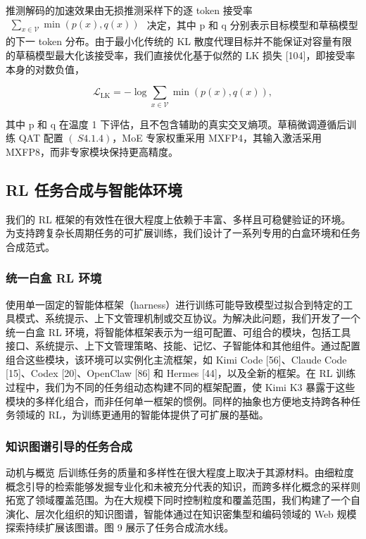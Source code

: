 推测解码的加速效果由无损推测采样下的逐 token 接受率 \(\begin{array} { r } { \sum _ { x \in \mathcal { V } } \operatorname* { m i n } ( p ( x ) , q ( x ) ) } \end{array}\) 决定，其中 p 和 q 分别表示目标模型和草稿模型的下一 token 分布。由于最小化传统的 KL 散度代理目标并不能保证对容量有限的草稿模型最大化该接受率，我们直接优化基于似然的 LK 损失 {[}104{]}，即接受率本身的对数负值，

\[
\mathcal {L} _ {\mathrm{LK}} = - \log \sum_ {x \in \mathcal {V}} \min (p (x), q (x)),\tag{16}
\]

其中 p 和 q 在温度 1 下评估，且不包含辅助的真实交叉熵项。草稿微调遵循后训练 QAT 配置 \(( \ S 4 . 1 . 4 )\)，MoE 专家权重采用 MXFP4，其输入激活采用 MXFP8，而非专家模块保持更高精度。

\subsection{RL 任务合成与智能体环境}\label{rl-task-synthesis-and-agentic-environments}

我们的 RL 框架的有效性在很大程度上依赖于丰富、多样且可稳健验证的环境。为支持跨复杂长周期任务的可扩展训练，我们设计了一系列专用的白盒环境和任务合成范式。

\subsubsection{统一白盒 RL 环境}\label{unified-white-box-rl-environment}

使用单一固定的智能体框架（harness）进行训练可能导致模型过拟合到特定的工具模式、系统提示、上下文管理机制或交互协议。为解决此问题，我们开发了一个统一白盒 RL 环境，将智能体框架表示为一组可配置、可组合的模块，包括工具接口、系统提示、上下文管理策略、技能、记忆、子智能体和其他组件。通过配置组合这些模块，该环境可以实例化主流框架，如 Kimi Code {[}56{]}、Claude Code {[}15{]}、Codex {[}20{]}、OpenClaw {[}86{]} 和 Hermes {[}44{]}，以及全新的框架。在 RL 训练过程中，我们为不同的任务组动态构建不同的框架配置，使 Kimi K3 暴露于这些模块的多样化组合，而非任何单一框架的惯例。同样的抽象也方便地支持跨各种任务领域的 RL，为训练更通用的智能体提供了可扩展的基础。

\subsubsection{知识图谱引导的任务合成}\label{knowledge-graph-guided-task-synthesis}

动机与概览 后训练任务的质量和多样性在很大程度上取决于其源材料。由细粒度概念引导的检索能够发掘专业化和未被充分代表的知识，而跨多样化概念的采样则拓宽了领域覆盖范围。为在大规模下同时控制粒度和覆盖范围，我们构建了一个自演化、层次化组织的知识图谱，智能体通过在知识密集型和编码领域的 Web 规模探索持续扩展该图谱。图 9 展示了任务合成流水线。

